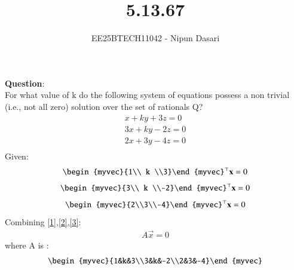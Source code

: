 \documentclass[journal]{IEEEtran}
\begin{document}
	
	
	\vspace{3cm}
	
	\title{5.13.67}
	\author{EE25BTECH11042 - Nipun Dasari}
	\maketitle
	
	\renewcommand{\thefigure}{\theenumi}
	\renewcommand{\thetable}{\theenumi}
	\setlength{\intextsep}{10pt} %
	
	
	\renewcommand{\thetable}{\theenumi}
	
	\textbf{Question}:\\
	For what value of k do the following system of equations possess a non trivial (i.e.,
	not all zero) solution over the set of rationals Q?
	\begin{align}
		x + ky + 3z = 0\\
	3x+ky-2z=0\\
		2x+3y-4z=0\\
	\end{align}
	\solution
	Given:
	\begin{align}
		\begin{myvec}{1\\ k \\3}\end{myvec}^\top\vec{x} = 0 \label{1}
	\end{align}
	\begin{align}
		\begin{myvec}{3\\ k \\-2}\end{myvec}^\top\vec{x} = 0\label{2}
	\end{align}
	\begin{align}
		\begin{myvec}{2\\3\\-4}\end{myvec}^\top\vec{x} = 0\label{3}
	\end{align}
	Combining \eqref{1},\eqref{2},\eqref{3}:
	\begin{align}
		A\vec{x}=0
	\end{align}
	where A is :
	\begin{align}
		\begin{myvec}{1&k&3\\3&k&-2\\2&3&-4}\end{myvec}
	\end{align}
\end{document}
